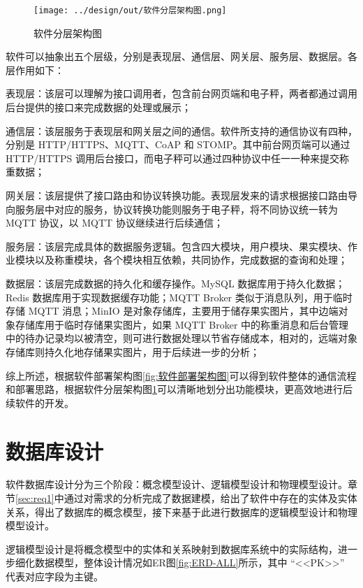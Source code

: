 \begin{figure}
    \centering
    \texttt{[image: ../design/out/软件分层架构图.png]}
    \caption{软件分层架构图}
    \label{fig:软件分层架构图}
\end{figure}

软件可以抽象出五个层级，分别是表现层、通信层、网关层、服务层、数据层。各层作用如下：

表现层：该层可以理解为接口调用者，包含前台网页端和电子秤，两者都通过调用后台提供的接口来完成数据的处理或展示；

通信层：该层服务于表现层和网关层之间的通信。软件所支持的通信协议有四种，分别是 HTTP/HTTPS、MQTT、CoAP 和 STOMP。其中前台网页端可以通过 HTTP/HTTPS 调用后台接口，而电子秤可以通过四种协议中任一一种来提交称重数据；

网关层：该层提供了接口路由和协议转换功能。表现层发来的请求根据接口路由导向服务层中对应的服务，协议转换功能则服务于电子秤，将不同协议统一转为 MQTT 协议，以 MQTT 协议继续进行后续通信；

服务层：该层完成具体的数据服务逻辑。包含四大模块，用户模块、果实模块、作业模块以及称重模块，各个模块相互依赖，共同协作，完成数据的查询和处理；

数据层：该层完成数据的持久化和缓存操作。MySQL 数据库用于持久化数据；Redis 数据库用于实现数据缓存功能；MQTT Broker 类似于消息队列，用于临时存储 MQTT 消息；MinIO 是对象存储库，主要用于储存果实图片，其中边端对象存储库用于临时存储果实图片，如果 MQTT Broker 中的称重消息和后台管理中的待办记录均以被清空，则可进行数据处理以节省存储成本，相对的，远端对象存储库则持久化地存储果实图片，用于后续进一步的分析；

综上所述，根据软件部署架构图\ref{fig:软件部署架构图}可以得到软件整体的通信流程和部署思路，根据软件分层架构图\ref{fig:软件分层架构图}可以清晰地划分出功能模块，更高效地进行后续软件的开发。

\section{数据库设计}\label{sec:database}

软件数据库设计分为三个阶段：概念模型设计、逻辑模型设计和物理模型设计\cite{苗雪兰2001数据库系统原理及应用教程}。章节\ref{sec:req1}中通过对需求的分析完成了数据建模，给出了软件中存在的实体及实体关系，得出了数据库的概念模型，接下来基于此进行数据库的逻辑模型设计和物理模型设计。

逻辑模型设计是将概念模型中的实体和关系映射到数据库系统中的实际结构\cite{苗雪兰2001数据库系统原理及应用教程}，进一步细化数据模型，整体设计情况如ER图\ref{fig:ERD-ALL}所示，其中 “<<PK>>” 代表对应字段为主键。

